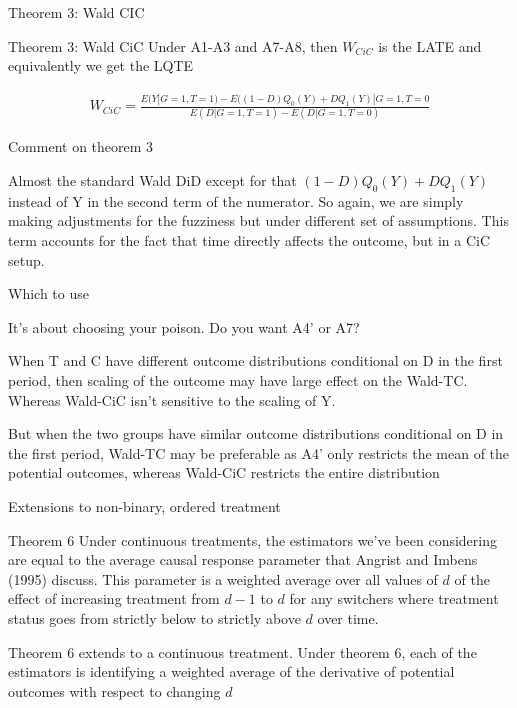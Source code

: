 \documentclass{beamer}
\begin{document}
\begin{frame}{Theorem 3: Wald CIC}

\begin{block}{Theorem 3: Wald CiC}
Under A1-A3 and A7-A8, then $W_{CiC}$ is the LATE and equivalently we get the LQTE
\end{block}

\footnotesize
\begin{eqnarray*}
W_{CiC} = \frac{
E(Y|G=1,T=1) - 
E((1-D)Q_0(Y) + DQ_1(Y) | G=1, T=0}{
E(D|G=1,T=1) - E(D|G=1,T=0)}
\end{eqnarray*}

\end{frame}

\begin{frame}{Comment on theorem 3}

Almost the standard Wald DiD except for that $(1-D)Q_0(Y) + DQ_1(Y)$ instead of Y in the second term of the numerator.  So again, we are simply making adjustments for the fuzziness but under different set of assumptions. This term accounts for the fact that time directly affects the outcome, but in a CiC setup.

\end{frame}

\begin{frame}{Which to use}

It's about choosing your poison.  Do you want A4' or A7? 

\bigskip

When T and C have different outcome distributions conditional on D in the first period, then scaling of the outcome may have large effect on the Wald-TC.  Whereas Wald-CiC isn't sensitive to the scaling of Y.

\bigskip

But when the two groups have similar outcome distributions conditional on D in the first period, Wald-TC may be preferable as A4' only restricts the mean of the potential outcomes, whereas Wald-CiC restricts the entire distribution

\end{frame}

\begin{frame}{Extensions to non-binary, ordered treatment}

\begin{block}{Theorem 6}
Under continuous treatments, the estimators we've been considering are equal to the average causal response parameter that Angrist and Imbens (1995) discuss.  This parameter is a weighted average over all values of $d$ of the effect of increasing treatment from $d-1$ to $d$ for any switchers where treatment status goes from strictly below to strictly above $d$ over time.
\end{block}

Theorem 6 extends to a continuous treatment.  Under theorem 6, each of the estimators is identifying a weighted average of the derivative of potential outcomes with respect to changing $d$

\end{frame}
\end{document}
